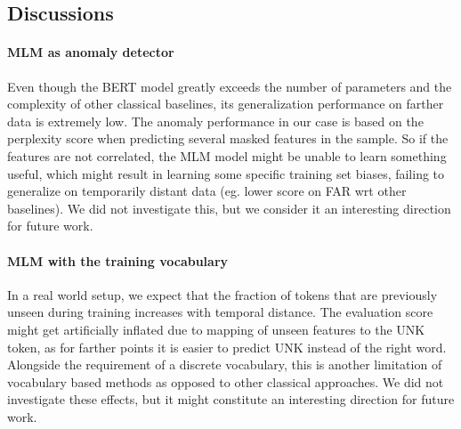 \documentclass{article}
\begin{document}
\subsection{Discussions}
\paragraph{MLM as anomaly detector} Even though the BERT model greatly exceeds the number of parameters and the complexity of other classical baselines, its generalization performance on farther data is extremely low. The anomaly performance in our case is based on the perplexity score when predicting several masked features in the sample. So if the features are not correlated, the MLM model might be unable to learn something useful, which might result in learning some specific training set biases, failing to generalize on temporarily distant data (eg. lower score on FAR wrt other baselines). We did not investigate this, but we consider it an interesting direction for future work.

\paragraph{MLM with the training vocabulary} In a real world setup, we expect that the fraction of tokens that are previously unseen during training increases with temporal distance. The evaluation score might get artificially inflated due to mapping of unseen features to the UNK token, as for farther points it is easier to predict UNK instead of the right word. Alongside the requirement of a discrete vocabulary, this is another limitation of vocabulary based methods as opposed to other classical approaches. We did not investigate these effects, but it might constitute an interesting direction for future work.
\end{document}

